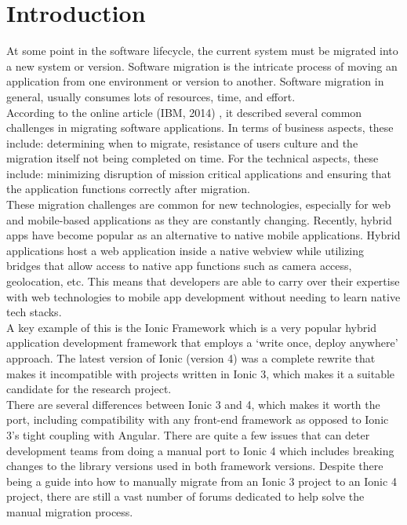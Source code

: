 \documentclass[conference]{IEEEtran}
\begin{document}
\section{Introduction}
At some point in the software lifecycle, the current system must be migrated into a new system or version. 
Software migration is the intricate process of moving an application from one environment or version to another. 
Software migration in general, usually consumes lots of resources, time, and effort. 
\\ According to the online article (IBM, 2014) \cite{b1}, it described several common challenges in migrating software applications. In terms of business aspects, these include: determining when to migrate, resistance of users culture and the migration itself not being completed on time. 
For the technical aspects, these include: minimizing disruption of mission critical applications and ensuring that the application functions correctly after migration.
\\ These migration challenges are common for new technologies, especially for web and mobile-based applications as they are constantly changing. Recently, hybrid apps have become popular as an alternative to native mobile applications. Hybrid applications host a web application inside a 
native webview while utilizing bridges that allow access to native app functions such as camera access, geolocation, etc. 
This means that developers are able to carry over their expertise with web technologies to mobile app development without needing to learn native tech stacks. 
\\ A key example of this is the Ionic Framework which is a very popular hybrid application development framework that employs a ‘write once, deploy anywhere’ approach. The latest version of Ionic (version 4) was 
a complete rewrite that makes it incompatible with projects written in Ionic 3, which makes it a suitable candidate for the research project.
\\ There are several differences between Ionic 3 and 4, which makes it worth the port, including compatibility with any front-end framework as opposed to Ionic 3’s tight coupling with Angular. 
There are quite a few issues that can deter development teams from doing a manual port to Ionic 4 which includes breaking changes to the library versions used in both framework versions. Despite there being a guide into how to manually migrate from an Ionic 3 project to an Ionic 4 project, 
there are still a vast number of forums dedicated to help solve the manual migration process. 
\end{document}
